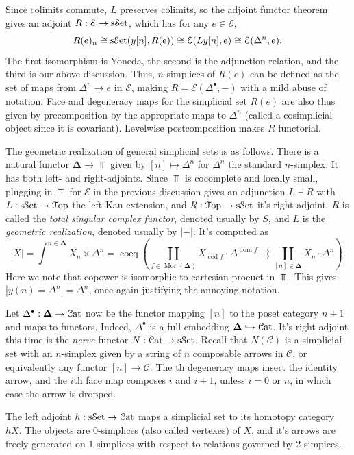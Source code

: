 Since colimits commute, $L$ preserves colimits, so the adjoint functor theorem gives an adjoint $R : \mathcal{E}  \to \mathrm{s}\mathcal{S}\mathrm{et}$, which has for any $e\in \mathcal{E} $,
\[
	R(e)_n\cong\mathrm{s}\mathcal{S}\mathrm{et}(y[n],R(e))\cong \mathcal{E} (Ly[n],e)\cong \mathcal{E} (\Delta^n,e)
.\]
The first isomorphism is Yoneda, the second is the adjunction relation, and the third is our above discussion. Thus, $n$-simplices of $R(e)$ can be defined as the set of maps from $\Delta^n\to e$ in $\mathcal{E} $, making $R=\mathcal{E} (\Delta^{\bullet} ,-)$ with a mild abuse of notation. Face and degeneracy maps for the simplicial set $R(e)$ are also thus given by precomposition by the appropriate maps to $\Delta^n$ (called a cosimplicial object since it is covariant). Levelwise postcomposition makes $R$ functorial.

The geometric realization of general simplicial sets is as follows. There is a natural functor $\boldsymbol{\Delta} \to \Top $ given by $[n]\mapsto \Delta^n$ for $\Delta^n$ the standard $n$-simplex. It has both left- and right-adjoints. Since $\Top $ is cocomplete and locally small, plugging in $\Top $ for $\mathcal{E} $ in the previous discussion gives an adjunction $L\dashv R$ with $L : \mathrm{s}\mathcal{S}\mathrm{et} \to \mathcal{T}\mathrm{op} $ the left Kan extension, and $R : \mathcal{T}\mathrm{op}  \to \mathrm{s}\mathcal{S}\mathrm{et}$ it's right adjoint. $R$ is called the \emph{total singular complex functor}, denoted usually by $S$, and $L$ is the \emph{geometric realization}, denoted usually by $\left| - \right| $. It's computed as
\[
	\left| X \right| =\int^{n\in \boldsymbol{\Delta} } X_n \times  \Delta^n=\operatorname{coeq} \left( \coprod_{f\in \operatorname{Mor} (\boldsymbol{\Delta} )} X_{\operatorname{cod}f} \cdot \Delta^{\operatorname{dom} f} \rightrightarrows \coprod_{[n]\in \boldsymbol{\Delta} } X_n \cdot \Delta^n \right) 
.\]
Here we note that copower is isomorphic to cartesian proeuct in $\Top $. This gives $\left| y(n)=\Delta^n \right| =\Delta^n$, once again justifying the annoying notation.

Let $\Delta^{\bullet} : \boldsymbol{\Delta}  \to \mathcal{C}\mathrm{at} $ now be the functor mapping $[n]$ to the poset category $n+1$ and maps to functors. Indeed, $\Delta^{\bullet} $ is a full embedding $\boldsymbol{\Delta} \hookrightarrow \mathcal{C}\mathrm{at} $. It's right adjoint this time is the \emph{nerve} functor $N : \mathcal{C}\mathrm{at}  \to \mathrm{s}\mathcal{S}\mathrm{et}$. Recall that $N(\mathcal{C} )$ is a simplicial set with an $n$-simplex given by a string of $n$ composable arrows in $\mathcal{C} $, or equivalently any functor $[n]\to \mathcal{C} $. The th degeneracy maps insert the identity arrow, and the $i$th face map composes $i$ and $i+1$, unless $i=0$ or $n$, in which case the arrow is dropped.

The left adjoint $h : \mathrm{s}\mathcal{S}\mathrm{et} \to \mathcal{C}\mathrm{at} $ maps a simplicial set to its homotopy category $hX$. The objects are 0-simplices (also called vertexes) of $X$, and it's arrows are freely generated on 1-simplices with respect to relations governed by 2-simpices.
